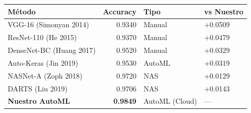 \begin{tabular}{lrll}
\toprule
Método & Accuracy & Tipo & vs Nuestro \\
\midrule
VGG-16 (Simonyan 2014) & 0.9340 & Manual & +0.0509 \\
ResNet-110 (He 2015) & 0.9370 & Manual & +0.0479 \\
DenseNet-BC (Huang 2017) & 0.9520 & Manual & +0.0329 \\
Auto-Keras (Jin 2019) & 0.9530 & AutoML & +0.0319 \\
NASNet-A (Zoph 2018) & 0.9720 & NAS & +0.0129 \\
DARTS (Liu 2019) & 0.9706 & NAS & +0.0143 \\
\midrule
\textbf{Nuestro AutoML} & \textbf{0.9849} & AutoML (Cloud) & --- \\
\bottomrule
\end{tabular}